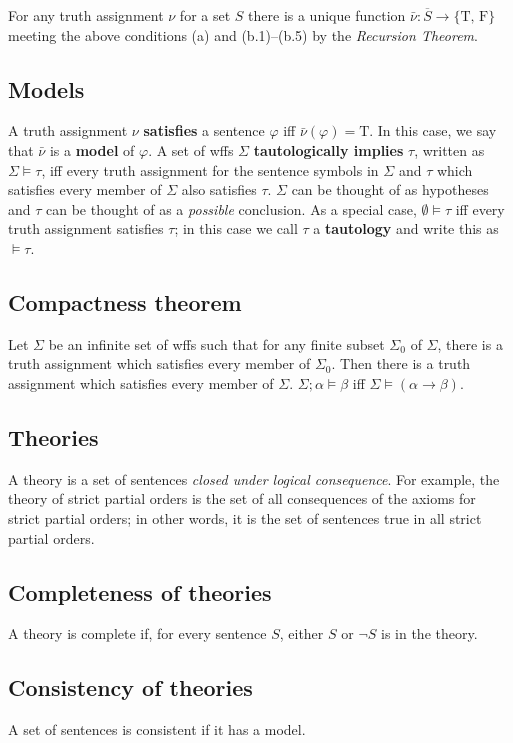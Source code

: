 For any truth assignment $\nu$ for a set $S$ there is a unique
	function $\bar{\nu}: \overline{S} \rightarrow \{\mbox{T, F}\}$
	meeting the above conditions (a) and (b.1)--(b.5) by the
	{\em{}Recursion Theorem\/}.

\subsection{Models}
A truth assignment $\nu$ {\bf{}satisfies} a sentence 
$\varphi$ iff $\bar\nu(\varphi) = \mbox{T}$. 
In this case, we say that $\bar{\nu}$ is a {\bf{}model} of $\varphi$.
A set of wffs $\Sigma$ {\bf{}tautologically implies} $\tau$, written as
$\Sigma \models \tau$, iff every truth assignment
for the sentence symbols in $\Sigma$ and $\tau$ which
satisfies every member of $\Sigma$ also satisfies $\tau$.
$\Sigma$ can be thought of as hypotheses and $\tau$
can be thought of as a {\em{}possible\/} conclusion.
As a special case, $\emptyset \models \tau$ iff every 
truth assignment satisfies $\tau$; in this case we call $\tau$
a {\bf{}tautology} and write this as $\models \tau$.
\subsection{Compactness theorem}
Let $\Sigma$ be an infinite set of wffs such that for any 
finite subset $\Sigma_0$ of $\Sigma$, there is a truth
assignment which satisfies every member of $\Sigma_0$.
Then there is a truth assignment which satisfies every
member of $\Sigma$.
 $\Sigma; \alpha \models \beta$ iff $\Sigma \models (\alpha
	\rightarrow \beta)$.



\subsection{Theories}
A theory is a set of sentences {\em closed under logical consequence}.
For example, the theory of strict partial orders is the set of all
consequences of the axioms for strict partial orders;
in other words, it is the set of sentences true in all strict partial orders.

\subsection{Completeness of theories}
A theory is complete if, for every sentence $S$, either $S$ or $\neg S$ is in
the theory.

\subsection{Consistency of theories}
A set of sentences is consistent if it has a model.


